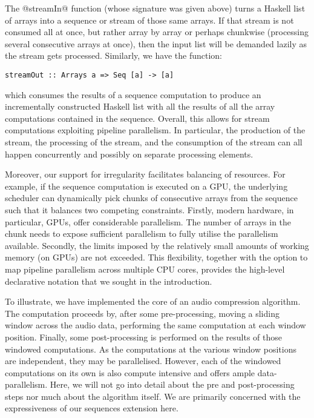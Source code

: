 The @streamIn@ function (whose signature was given above) turns a Haskell list of arrays into a sequence or stream of those same arrays. If that stream is not consumed all at once, but rather array by array or perhaps chunkwise (processing several consecutive arrays at once), then the input list will be demanded lazily as the stream gets processed. Similarly, we have the function:
%
\begin{lstlisting}
streamOut :: Arrays a => Seq [a] -> [a]
\end{lstlisting}
%
which consumes the results of a sequence computation to produce an incrementally constructed Haskell list with all the results of all the array computations contained in the sequence. Overall, this allows for stream computations exploiting pipeline parallelism. In particular, the production of the stream, the processing of the stream, and the consumption of the stream can all happen concurrently and possibly on separate processing elements.

Moreover, our support for irregularity facilitates balancing of resources. For example, if the sequence computation is executed on a GPU, the underlying scheduler can dynamically pick chunks of consecutive arrays from the sequence such that it balances two competing constraints. Firstly, modern hardware, in particular, GPUs, offer considerable parallelism. The number of arrays in the chunk needs to expose sufficient parallelism to fully utilise the parallelism available. Secondly, the limits imposed by the relatively small amounts of working memory (on GPUs) are not exceeded. This flexibility, together with the option to map pipeline parallelism across multiple CPU cores, provides the high-level declarative notation that we sought in the introduction.

To illustrate, we have implemented the core of an audio compression algorithm. The computation proceeds by, after some pre-processing, moving a sliding window across the audio data, performing the same computation at each window position. Finally, some post-processing is performed on the results of those windowed computations. As the computations at the various window positions are independent, they may be parallelised. However, each of the windowed computations on its own is also compute intensive and offers ample data-parallelism. Here, we will not go into detail about the pre and post-processing steps nor much about the algorithm itself. We are primarily concerned with the expressiveness of our sequences extension here.

